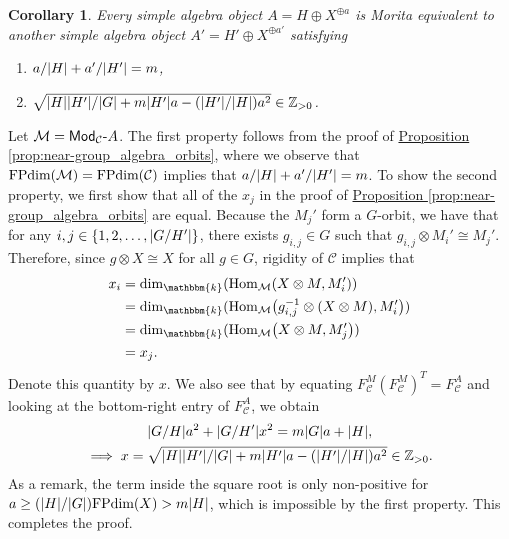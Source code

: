 \documentclass[12pt, reqno]{amsart}
\numberwithin{equation}{section}
\theoremstyle{plainspace}
\newtheorem{corollary}[theorem]{Corollary}
\theoremstyle{definitionspace}
\theoremstyle{remarkspace}
\renewenvironment{proof}{{\noindent\textbf{Proof.}}}{\null\hfill\qedsymbol}
\DeclarePairedDelimiter{\abs}{\lvert}{\rvert}
\newcommand{\mathcat}[1]{\mathcal{#1}}
\newcommand{\Hom}[2][]{
	\ifthenelse{\equal{#2}{}}
		{\textup{Hom}_{#1}}
		{\textup{Hom}_{#1}\!\left(#2\right)}
}
\newcommand{\textcat}[1]{\textup{\textsf{#1}}}
\newcommand{\rmodcat}[2][]{\textcat{Mod}_{#1}\textcat{-}#2}
\newcommand{\FPdim}{\textup{FPdim}}
\begin{document}
\begin{corollary}\label{cor:near-group_algebra_properties}
Every simple algebra object $A = H \oplus X^{\oplus a}$ is Morita equivalent to another simple algebra object $A' = H' \oplus X^{\oplus a'}$ satisfying
\begin{enumerate}[start=1, leftmargin=1.5cm, label={(\arabic*).}]
\item $a/\abs{H} + a'/\abs{H'} = m$,
\item $\sqrt{\abs{H}\abs{H'}/\abs{G} + m\abs{H'}a - (\abs{H'}/\abs{H})a^2} \in \mathbb{Z}_{>0}$.
\end{enumerate}
\end{corollary}
\leavevmode\newline
\begin{proof}
\noindent Let $\mathcat{M} = \rmodcat[\mathcat{C}]{A}$. The first property follows from the proof of \hyperref[prop:near-group_algebra_orbits]{Proposition \ref*{prop:near-group_algebra_orbits}}, where we observe that $\FPdim(\mathcat{M}) = \FPdim(\mathcat{C})$ implies that $a/\abs{H} + a'/\abs{H'} = m$. To show the second property, we first show that all of the $x_j$ in the proof of \hyperref[prop:near-group_algebra_orbits]{Proposition \ref*{prop:near-group_algebra_orbits}} are equal. Because the $M_j'$ form a $G$-orbit, we have that for any $i, j \in \{1, 2, \dots, \abs{G/H'}\}$, there exists $g_{i,j} \in G$ such that $g_{i,j} \otimes M_i' \cong M_j'$. Therefore, since $g \otimes X \cong X$ for all $g \in G$, rigidity of $\mathcat{C}$ implies that
\begin{align*}
\begin{split}
x_i &= \dim_{\mathbbm{k}}(\Hom[\mathcat{M}]{X \otimes M, M_i'}) \\
&= \dim_{\mathbbm{k}}(\Hom[\mathcat{M}]{g_{i,j}^{-1} \otimes (X \otimes M), M_i'}) \\
&= \dim_{\mathbbm{k}}(\Hom[\mathcat{M}]{X \otimes M, M_j'}) \\
&= x_j.
\end{split}
\end{align*}
\noindent Denote this quantity by $x$. We also see that by equating $F_{\mathcat{C}}^M(F_{\mathcat{C}}^M)^T = F_{\mathcat{C}}^A$ and looking at the bottom-right entry of $F_{\mathcat{C}}^A$, we obtain
\begin{gather*}
\abs{G/H}a^2 + \abs{G/H'}x^2 = m\abs{G}a + \abs{H}, \\
\implies x = \sqrt{\abs{H}\abs{H'}/\abs{G} + m\abs{H'}a - (\abs{H'}/\abs{H})a^2} \in \mathbb{Z}_{>0}.
\end{gather*}
\noindent As a remark, the term inside the square root is only non-positive for $a \geq (\abs{H}/\abs{G})\FPdim(X) > m\abs{H}$, which is impossible by the first property. This completes the proof.
\end{proof}
\newline
\end{document}
